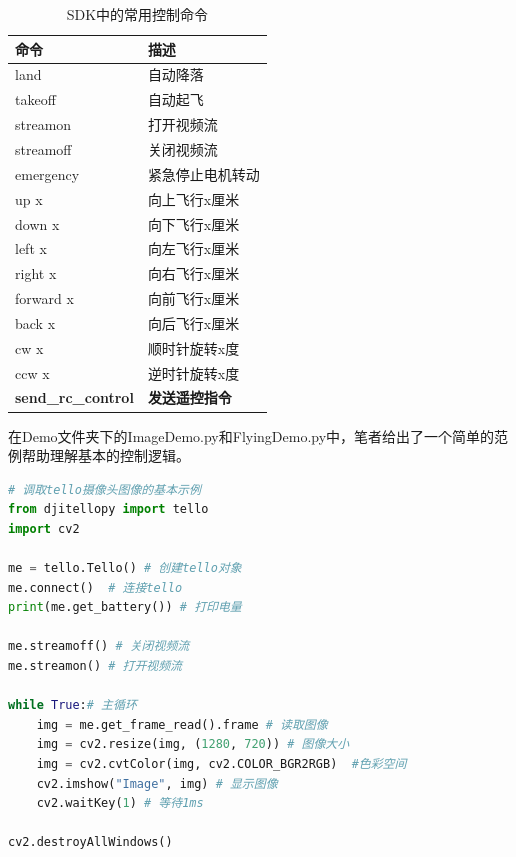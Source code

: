 \documentclass[report, twoside, UTF8, AutoFakeBold = 1, AutoFakeSlant, zihao = -4]{config}
\begin{document}
\begin{table}[H]
    \centering
    \caption{SDK中的常用控制命令}
    \label{tab:three-line-with-note}
    \renewcommand\arraystretch{1.3} %
    \setlength{\tabcolsep}{20pt} %
    \begin{threeparttable}[c]
        \begin{tabular}{ll}
            \toprule[1.5pt]
            \textbf{命令}           & \textbf{描述}\\
            \midrule[0.8pt]
            land             & 自动降落\\
            takeoff          & 自动起飞\\
            streamon         & 打开视频流\\
            streamoff        & 关闭视频流\\
            emergency        & 紧急停止电机转动\\
            up x             & 向上飞行x厘米\\
            down x           & 向下飞行x厘米\\
            left x           & 向左飞行x厘米\\
            right x          & 向右飞行x厘米\\
            forward x        & 向前飞行x厘米\\
            back x           & 向后飞行x厘米\\
            cw x             & 顺时针旋转x度\\
            ccw x            & 逆时针旋转x度\\
            \textbf{send\_rc\_control}  & \textbf{发送遥控指令}\\
            \bottomrule[1.5pt]
        \end{tabular}
    \end{threeparttable}
\end{table}

在Demo文件夹下的ImageDemo.py和FlyingDemo.py中，笔者给出了一个简单的范例帮助理解基本的控制逻辑。

\begin{lstlisting}[language=Python, caption=ImageDemo.py代码]
# 调取tello摄像头图像的基本示例
from djitellopy import tello
import cv2

me = tello.Tello() # 创建tello对象
me.connect()  # 连接tello
print(me.get_battery()) # 打印电量

me.streamoff() # 关闭视频流
me.streamon() # 打开视频流

while True:# 主循环
    img = me.get_frame_read().frame # 读取图像
    img = cv2.resize(img, (1280, 720)) # 图像大小
    img = cv2.cvtColor(img, cv2.COLOR_BGR2RGB)  #色彩空间
    cv2.imshow("Image", img) # 显示图像
    cv2.waitKey(1) # 等待1ms

cv2.destroyAllWindows()
\end{lstlisting}
\end{document}
